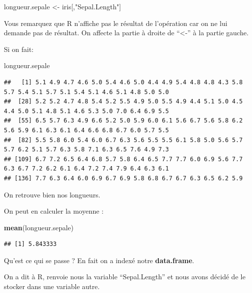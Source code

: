 \documentclass[
]{book}
\newenvironment{Shaded}{\begin{snugshade}}{\end{snugshade}}
\newcommand{\FunctionTok}[1]{\textcolor[rgb]{0.13,0.29,0.53}{\textbf{#1}}}
\newcommand{\NormalTok}[1]{#1}
\newcommand{\OtherTok}[1]{\textcolor[rgb]{0.56,0.35,0.01}{#1}}
\newcommand{\StringTok}[1]{\textcolor[rgb]{0.31,0.60,0.02}{#1}}
\begin{document}
\begin{Shaded}
\begin{Highlighting}[]
\NormalTok{longueur.sepale }\OtherTok{\textless{}{-}}\NormalTok{ iris[,}\StringTok{"Sepal.Length"}\NormalTok{]}
\end{Highlighting}
\end{Shaded}

Vous remarquez que R n'affiche pas le résultat de l'opération car on ne lui demande
pas de résultat. On affecte la partie à droite de ``\textless-'' à la partie gauche.

Si on fait:

\begin{Shaded}
\begin{Highlighting}[]
\NormalTok{longueur.sepale}
\end{Highlighting}
\end{Shaded}

\begin{verbatim}
##   [1] 5.1 4.9 4.7 4.6 5.0 5.4 4.6 5.0 4.4 4.9 5.4 4.8 4.8 4.3 5.8 5.7 5.4 5.1 5.7 5.1 5.4 5.1 4.6 5.1 4.8 5.0 5.0
##  [28] 5.2 5.2 4.7 4.8 5.4 5.2 5.5 4.9 5.0 5.5 4.9 4.4 5.1 5.0 4.5 4.4 5.0 5.1 4.8 5.1 4.6 5.3 5.0 7.0 6.4 6.9 5.5
##  [55] 6.5 5.7 6.3 4.9 6.6 5.2 5.0 5.9 6.0 6.1 5.6 6.7 5.6 5.8 6.2 5.6 5.9 6.1 6.3 6.1 6.4 6.6 6.8 6.7 6.0 5.7 5.5
##  [82] 5.5 5.8 6.0 5.4 6.0 6.7 6.3 5.6 5.5 5.5 6.1 5.8 5.0 5.6 5.7 5.7 6.2 5.1 5.7 6.3 5.8 7.1 6.3 6.5 7.6 4.9 7.3
## [109] 6.7 7.2 6.5 6.4 6.8 5.7 5.8 6.4 6.5 7.7 7.7 6.0 6.9 5.6 7.7 6.3 6.7 7.2 6.2 6.1 6.4 7.2 7.4 7.9 6.4 6.3 6.1
## [136] 7.7 6.3 6.4 6.0 6.9 6.7 6.9 5.8 6.8 6.7 6.7 6.3 6.5 6.2 5.9
\end{verbatim}

On retrouve bien nos longueurs.

On peut en calculer la moyenne :

\begin{Shaded}
\begin{Highlighting}[]
\FunctionTok{mean}\NormalTok{(longueur.sepale)}
\end{Highlighting}
\end{Shaded}

\begin{verbatim}
## [1] 5.843333
\end{verbatim}

Qu'est ce qui se passe ? En fait on a indexé notre \textbf{data.frame}.

On a dit à R, renvoie nous la variable ``Sepal.Length'' et nous avons décidé de le
stocker dans une variable autre.
\end{document}

